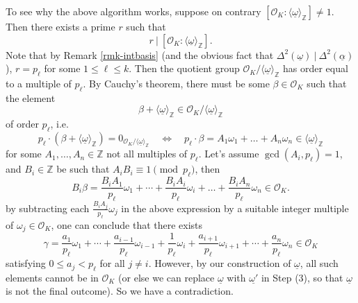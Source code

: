 \documentclass[11pt]{book}
\begin{document}
To see why the above algorithm works, suppose on contrary $[\mathcal{O}_K: \langle \underline{\omega} \rangle_{\mathbb{Z}}] \neq 1$. Then there exists a prime $r$ such that 
$$r\ |\ [\mathcal{O}_K: \langle \underline{\omega} \rangle_{\mathbb{Z}}].$$ 
Note that by Remark \ref{rmk-intbasis} (and the obvious fact that $\Delta^2(\underline{\omega})\ |\ \Delta^2(\underline{\alpha})$), 
$r = p_{\ell}$ for some $1 \leq \ell \leq k$. Then the quotient group $\mathcal{O}_K/\langle \underline{\omega} \rangle_{\mathbb{Z}}$ has order equal to a multiple of $p_{\ell}$. By Cauchy's theorem, there must be some $\beta \in \mathcal{O}_K$ such that the element 
            $$\beta +  \langle \underline{\omega} \rangle_{\mathbb{Z}} \in  \mathcal{O}_K/\langle \underline{\omega} \rangle_{\mathbb{Z}}$$
    of order $p_{\ell}$, i.e. 
    $$p_{\ell} \cdot (\beta + \langle \underline{\omega} \rangle_{\mathbb{Z}}) = 0_{\mathcal{O}_K/\langle \underline{\omega} \rangle_{\mathbb{Z}}}  \quad \Leftrightarrow \quad p_{\ell}\cdot \beta = A_1 \omega_1 + \dots + A_n \omega_n \in \langle \underline{\omega} \rangle_{\mathbb{Z}}$$
    for some $A_1, \dots, A_n \in \mathbb{Z}$ not all multiples of $p_{\ell}$. Let's assume $\gcd(A_i,p_{\ell})=1$, and $B_i \in \mathbb{Z}$ be such that $A_iB_i \equiv 1 \pmod{p_{\ell}}$, then 
    $$B_i \beta = \frac{B_iA_1}{p_{\ell}}\omega_1+\cdots+\frac{B_iA_i}{p_{\ell}}\omega_i+\dots+\frac{B_iA_n}{p_{\ell}}\omega_n \in \mathcal{O}_K.$$
by subtracting each $\frac{B_iA_j}{p_{\ell}}\omega_j$ in the above expression by a suitable integer multiple of $\omega_j \in \mathcal{O}_K$, one can conclude that there exists
$$\gamma =\frac{a_1}{p_{\ell}}\omega_1+\cdots+\frac{a_{i-1}}{p_{\ell}}\omega_{i-1}+\frac{1}{p_{\ell}}\omega_i+\frac{a_{i+1}}{p_{\ell}}\omega_{i+1}+\cdots+\frac{a_n}{p_{\ell}}\omega_n \in \mathcal{O}_K$$
satisfying $0 \leq a_j < p_{\ell}$ for all $j \neq i$. However, by our construction of $\underline{\omega}$, all such elements cannot be in $\mathcal{O}_K$ (or else we can replace $\underline{\omega}$ with $\underline{\omega'}$ in Step (3), so that $\underline{\omega}$ is not the final outcome). So we have a contradiction.
\end{document}
